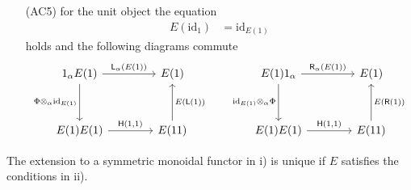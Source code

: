 \begin{thm}
\begin{enumerate}
\begin{enumerate}
\item[(AC5)]
for the unit object the equation
\begin{align*}
  E(\mathrm{id}_{1})
  &=
  \mathrm{id}_{E(1)}
\end{align*}
holds and the following diagrams commute
\begin{equation*}
\begin{tikzcd}[row sep=3.3em,column sep=4em]
  1_{\alpha} E(1)
  \ar{r}{\mathsf{L}_{\alpha}(E(1))}
  \ar{d}[swap]{\Phi \otimes_{\alpha} \mathrm{id}_{E(1)}}
  &
  E(1)
  \\
  E(1) E(1)
  \ar{r}{\mathsf{H}(1,1)}
  &
  E(1 1)
  \ar{u}[swap]{E(\mathsf{L}(1))}
\end{tikzcd}
\qquad
\begin{tikzcd}[row sep=3.3em,column sep=4em]
  E(1) 1_{\alpha}
  \ar{r}{\mathsf{R}_{\alpha}(E(1))}
  \ar{d}[swap]{\mathrm{id}_{E(1)} \otimes_{\alpha} \Phi}
  &
  E(1)
  \\
  E(1) E(1)
  \ar{r}{\mathsf{H}(1,1)}
  &
  E(1 1)
  \ar{u}[swap]{E(\mathsf{R}(1))}
\end{tikzcd}
\end{equation*}
\end{enumerate}
The extension to a symmetric monoidal functor in i) is unique if $E$ satisfies the conditions in ii).
\end{enumerate}
\end{thm}
